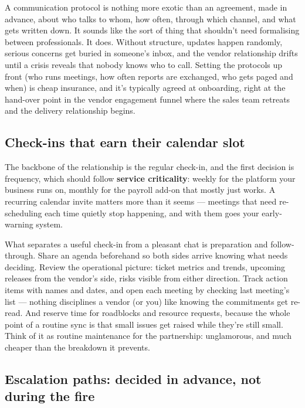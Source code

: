 A communication protocol is nothing more exotic than an agreement, made in advance, about who talks to whom, how often, through which channel, and what gets written down. It sounds like the sort of thing that shouldn't need formalising between professionals. It does. Without structure, updates happen randomly, serious concerns get buried in someone's inbox, and the vendor relationship drifts until a crisis reveals that nobody knows who to call. Setting the protocols up front (who runs meetings, how often reports are exchanged, who gets paged and when) is cheap insurance, and it's typically agreed at onboarding, right at the hand-over point in the vendor engagement funnel where the sales team retreats and the delivery relationship begins.



\subsection{Check-ins that earn their calendar slot}


The backbone of the relationship is the regular check-in, and the first decision is frequency, which should follow \textbf{service criticality}: weekly for the platform your business runs on, monthly for the payroll add-on that mostly just works. A recurring calendar invite matters more than it seems — meetings that need re-scheduling each time quietly stop happening, and with them goes your early-warning system.


What separates a useful check-in from a pleasant chat is preparation and follow-through. Share an agenda beforehand so both sides arrive knowing what needs deciding. Review the operational picture: ticket metrics and trends, upcoming releases from the vendor's side, risks visible from either direction. Track action items with names and dates, and open each meeting by checking last meeting's list — nothing disciplines a vendor (or you) like knowing the commitments get re-read. And reserve time for roadblocks and resource requests, because the whole point of a routine sync is that small issues get raised while they're still small. Think of it as routine maintenance for the partnership: unglamorous, and much cheaper than the breakdown it prevents.



\subsection{Escalation paths: decided in advance, not during the fire}


